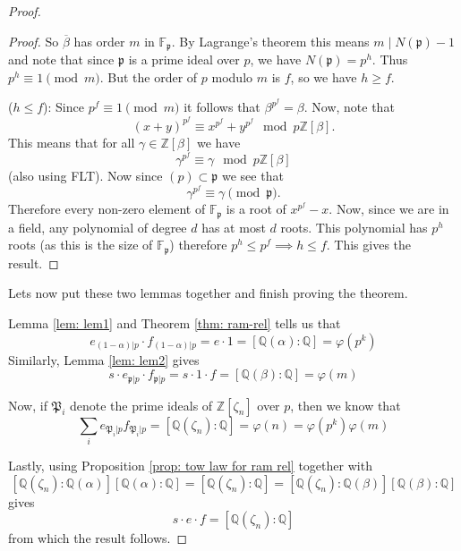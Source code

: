 \documentclass[11pt,a4paper]{report}
\theoremstyle{plain}
\theoremstyle{definition}
\theoremstyle{definition}
\newcommand{\ZZ}{\mathbb{Z}}
\def\FF{\mathbb{F}}
\def\QQ{\mathbb{Q}}
\def \gothP{\mathfrak{P}}
\def\gothp{\mathfrak{p}}
\def \a{\alpha}
\def \ov{\overline}
\begin{document}
\begin{proof}
\begin{proof}
		So $\ov{\beta}$ has order $m$ in $\FF_{\gothp}$. By Lagrange's theorem this means $m\mid N(\gothp)-1$ and note that since $\gothp$ is a prime ideal over $p$, we have $N(\gothp)=p^h$. Thus $p^h \equiv 1 \pmod m$. But the order of $p$ modulo $m$ is $f$, so we have $h \geq f$.
		
		
		($h \leq f$): Since $p^f \equiv 1 \pmod m$ it follows that $\beta^{p^f} = \beta$. Now, note that \[(x+y)^{p^f} \equiv x^{p^f}+y^{p^f} \mod p\ZZ[\beta].\] This means that for all $\gamma \in \ZZ[\beta]$ we have \[\gamma^{p^f} \equiv \gamma \mod p\ZZ[\beta]\] (also using FLT). Now since $(p) \subset \gothp$ we see that \[\gamma^{p^f} \equiv \gamma \pmod \gothp.\] Therefore every non-zero element of $\FF_{\gothp}$ is a root of $x^{p^f}-x$. Now, since we are in a field, any polynomial of degree $d$ has at most $d$ roots. This polynomial has $p^h$ roots (as this is the size of $\FF_{\gothp}$) therefore $p^h \leq p^f \implies h \leq f$. This gives the result.
		
		
		
	\end{proof}
	
	
	Lets now put these two lemmas together and finish proving the theorem. 
	
	Lemma \ref{lem: lem1} and Theorem \ref{thm: ram-rel} tells us that \[e_{(1-\a)|p} \cdot f_{(1-\a)|p}=e \cdot 1=[\QQ(\a):\QQ]=\varphi(p^k)\]
	Similarly, Lemma \ref{lem: lem2} gives \[s \cdot e_{\gothp|p}\cdot f_{\gothp|p}=s \cdot 1\cdot f=[\QQ(\beta):\QQ]=\varphi(m)\]
	
	Now, if $\gothP_i$ denote the prime ideals of $\ZZ[\zeta_n]$ over $p$, then we know that  \[\sum_i e_{\gothP_i|p}f_{\gothP_i|p}=[\QQ(\zeta_n):\QQ]=\varphi(n)=\varphi(p^k)\varphi(m)\]
	
	Lastly, using Proposition \ref{prop: tow law for ram rel} together with \[[\QQ(\zeta_n):\QQ(\a)][\QQ(\a):\QQ]=[\QQ(\zeta_n):\QQ]=[\QQ(\zeta_n):\QQ(\beta)][\QQ(\beta):\QQ]\] gives \[s \cdot e \cdot f=[\QQ(\zeta_n):\QQ]\] from which the result follows.
	
	
\end{proof}
\end{document}
